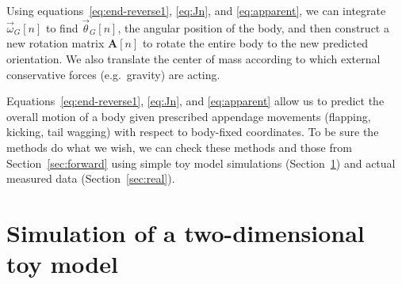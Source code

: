 \documentclass{amsart}
\begin{document}
Using equations~\ref{eq:end-reverse1}, \ref{eq:Jn}, and \ref{eq:apparent}, we can integrate $\vec\omega_G[n]$ to find $\vec\theta_G[n]$, the angular position of the body, and then construct a new rotation matrix $\mathbf{A}[n]$ to rotate the entire body to the new predicted orientation.  We also translate the center of mass according to which external conservative forces (e.g.\ gravity) are acting.

Equations~\ref{eq:end-reverse1}, \ref{eq:Jn}, and \ref{eq:apparent} allow us to predict the overall motion of a body given prescribed appendage movements (flapping, kicking, tail wagging) with respect to body-fixed coordinates.  To be sure the methods do what we wish, we can check these methods and those from Section~\ref{sec:forward} using simple toy model simulations (Section~\ref{sec:toy}) and actual measured data (Section~\ref{sec:real}). 

\section{Simulation of a two-dimensional toy model}
\label{sec:toy}
\end{document}
